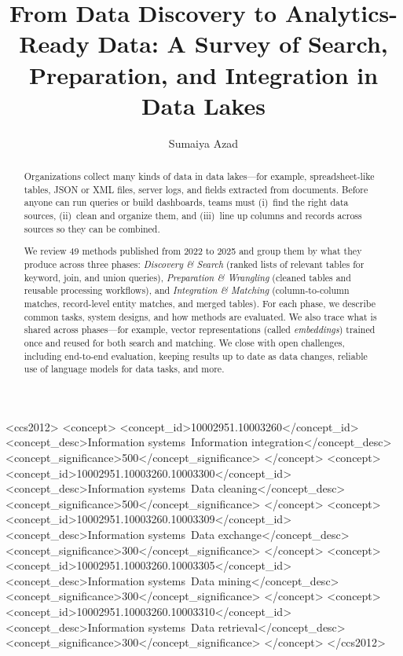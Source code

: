 \documentclass[sigconf,nonacm]{acmart}
\date{}
\begin{document}
\title[Survey of Data Discovery to Integration in Data Lakes]%
{From Data Discovery to Analytics-Ready Data: A Survey of Search, Preparation, and Integration in Data Lakes}

\author{Sumaiya Azad}

\renewcommand{\shortauthors}{Author et al.}



\begin{abstract}
Organizations collect many kinds of data in data lakes---for example, spreadsheet-like tables, JSON or XML files, server logs, and fields extracted from documents. Before anyone can run queries or build dashboards, teams must (i)~find the right data sources, (ii)~clean and organize them, and (iii)~line up columns and records across sources so they can be combined.

We review 49 methods published from 2022 to 2025 and group them by what they produce across three phases: \emph{Discovery \& Search} (ranked lists of relevant tables for keyword, join, and union queries), \emph{Preparation \& Wrangling} (cleaned tables and reusable processing workflows), and \emph{Integration \& Matching} (column-to-column matches, record-level entity matches, and merged tables). For each phase, we describe common tasks, system designs, and how methods are evaluated. We also trace what is shared across phases---for example, vector representations (called \emph{embeddings}) trained once and reused for both search and matching. We close with open challenges, including end-to-end evaluation, keeping results up to date as data changes, reliable use of language models for data tasks, and more.
\end{abstract}

\begin{CCSXML}
<ccs2012>
 <concept>
  <concept_id>10002951.10003260</concept_id>
  <concept_desc>Information systems~Information integration</concept_desc>
  <concept_significance>500</concept_significance>
 </concept>
 <concept>
  <concept_id>10002951.10003260.10003300</concept_id>
  <concept_desc>Information systems~Data cleaning</concept_desc>
  <concept_significance>500</concept_significance>
 </concept>
 <concept>
  <concept_id>10002951.10003260.10003309</concept_id>
  <concept_desc>Information systems~Data exchange</concept_desc>
  <concept_significance>300</concept_significance>
 </concept>
 <concept>
  <concept_id>10002951.10003260.10003305</concept_id>
  <concept_desc>Information systems~Data mining</concept_desc>
  <concept_significance>300</concept_significance>
 </concept>
 <concept>
  <concept_id>10002951.10003260.10003310</concept_id>
  <concept_desc>Information systems~Data retrieval</concept_desc>
  <concept_significance>300</concept_significance>
 </concept>
</ccs2012>
\end{CCSXML}
\end{document}
